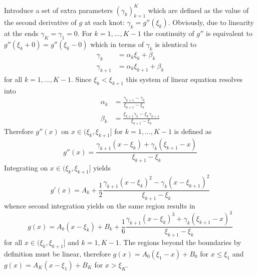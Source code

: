 \documentclass[a4paper]{article}
\begin{document}
Introduce a set of extra parameters $(\gamma_k)_{k=1}^K$ which are defined as the
value of the second derivative of $g$ at each knot: $\gamma_k=g''(\xi_k)$.
Obviously, due to linearity at the ends $\gamma_K = \gamma_1 = 0$.
For $k=1,\ldots, K-1$ the continuity of $g''$ is equivalent to $g''(\xi_k+0) = g''(\xi_k-0)$
which in terms of $\gamma_k$ is identical to
\begin{align*}
	\gamma_k &= \alpha_k \xi_k + \beta_k\\
	\gamma_{k+1} &= \alpha_k \xi_{k+1} + \beta_k
\end{align*}
for all $k=1,\ldots,K-1$. Since $\xi_k<\xi_{k+1}$ this system of linear equation
resolves into
\begin{align*}
	\alpha_k &= \frac{\gamma_{k+1}-\gamma_k}{\xi_{k+1}-\xi_k}\\
	\beta_k &= \frac{\xi_{k+1}\gamma_k - \xi_k\gamma_{k+1}}{\xi_{k+1}-\xi_k}
\end{align*}
Therefore $g''(x)$ on $x\in (\xi_k, \xi_{k+1}]$ for $k=1,\ldots, K-1$ is defined as
\[g''(x) = \frac{\gamma_{k+1}(x-\xi_k)+\gamma_k(\xi_{k+1}-x)}{\xi_{k+1}-\xi_k}\]
Integrating on $x\in (\xi_k,\xi_{k+1}]$ yields
\[g'(x) = A_k + \frac{1}{2}\frac{\gamma_{k+1}(x-\xi_k)^2-\gamma_k(x-\xi_{k+1})^2}{\xi_{k+1}-\xi_k}\]
whence second integration yields on the same region results in
\[
g(x)
= A_k(x - \xi_k) + B_k + \frac{1}{6}
	\frac{\gamma_{k+1}(x-\xi_k)^3+\gamma_k(\xi_{k+1}-x)^3}{\xi_{k+1}-\xi_k}
\]
for all $x\in (\xi_k,\xi_{k+1}]$ and $k=1, K-1$. The regions beyond the boundaries
by definition must be linear, therefore $g(x) = A_0 (\xi_1-x) + B_0$ for $x\leq \xi_1$
and $g(x) = A_K (x-\xi_1) + B_K$ for $x > \xi_K$.
\end{document}
